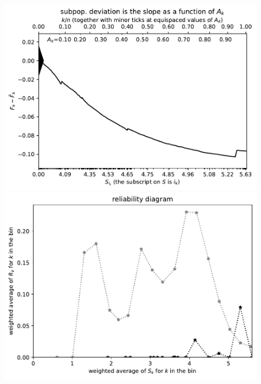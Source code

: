 \documentclass{article}
\begin{document}
\begin{figure}
\begin{centering}

\parbox{\imsize}{\includegraphics[width=\imsize]
{./codes/weighted/County_of_Humboldt-LNGI/cumulative}}
\quad\quad
\parbox{\imsize}{\includegraphics[width=\imsize]
{./codes/weighted/County_of_Humboldt-LNGI/equiscores20}}

\vspace{\vertsep}


\end{centering}
\end{figure}
\end{document}
